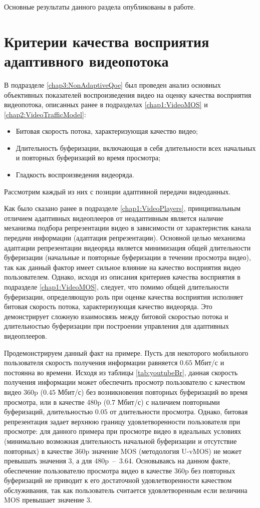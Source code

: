 Основные результаты данного раздела опубликованы в работе.

\section{Критерии качества восприятия адаптивного видеопотока}
\label{chap4:AdaptiveQoe}

В подразделе \ref{chap3:NonAdaptiveQoe} был проведен анализ основных объективных показателей воспроизведения видео на оценку качества восприятия видеопотока, описанных ранее в подразделах \ref{chap1:VideoMOS} и \ref{chap2:VideoTrafficModel}:
\begin{itemize}
	\item Битовая скорость потока, характеризующая качество видео;
	\item Длительность буферизации, включающая в себя длительности всех начальных и повторных буферизаций во время просмотра;
	\item Гладкость воспроизведения видеоряда.
\end{itemize}
Рассмотрим каждый из них с позиции адаптивной передачи видеоданных.

Как было сказано ранее в подразделе \ref{chap1:VideoPlayers}, принципиальным отличием адаптивных видеоплееров от неадаптивным является наличие механизма подбора репрезентации видео в зависимости от характеристик канала передачи информации (адаптация репрезентации). Основной целью механизма адаптации репрезентации видеоряда является минимизация общей длительности буферизации (начальные и повторные буферизации в течении просмотра видео), так как данный фактор имеет сильное влияние на качество восприятия видео пользователем. Однако, исходя из описания критериев качества восприятия в подразделе \ref{chap1:VideoMOS}, следует, что помимо общей длительности буферизации, определяющую роль при оценке качества восприятия исполняет битовая скорость потока, характеризующая качество видеоряда. Это демонстрирует сложную взаимосвязь между битовой скоростью потока и длительностью буферизации при построении управления для адаптивных видеоплееров.

Продемонстрируем данный факт на примере. Пусть для некоторого мобильного пользователя скорость получения информации равняется $0.65$ Мбит/с и постоянна во времени. Исходя из таблицы \ref{tab:youtubeBr}, данная скорость получения информации может обеспечить просмотр пользователю с качеством видео 360p ($0.45$ Мбит/с) без возникновения повторных буферизаций во время просмотра, или в качестве 480p ($0.7$ Мбит/с) с наличием повторными буферизаций, длительностью $0.05$ от длительности просмотра. Однако, битовая репрезентация задает верхнюю границу удовлетворенности пользователя при просмотре: для данного примера при просмотре видео в идеальных условиях (минимально возможная длительность начальной буферизации и отсутствие повторных) в качестве 360p значение MOS (методология U-vMOS) не может превышать значения 3, а для 480p~--~3.64. Основываясь на данном факте, обеспечение пользователю просмотра видео в качестве 360p без повторных буферизаций не приводит к его достаточной удовлетворенности качеством обслуживания, так как пользователь считается удовлетворенным если величина MOS превышает значение 3.

